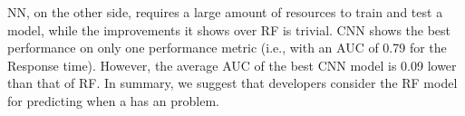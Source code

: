 NN, on the other side, requires a large amount of resources to train and test a model, while the improvements it shows over RF is trivial.
CNN shows the best performance on only one performance metric (i.e., with an AUC of 0.79 for the Response time). However, the average AUC of the best CNN model is 0.09 lower than that of RF. 
In summary, we suggest that developers consider the RF model for predicting when a \instance has an \inconsistent problem. 

